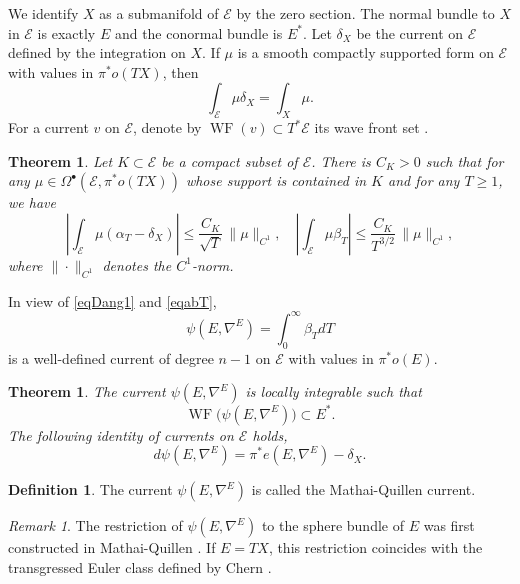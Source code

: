 \documentclass[JEP,XML,SOM,Unicode]{cedram}
\newcommand{\sbullet}{{\scriptscriptstyle\bullet}}
\let\mathcal\mathscr
\theoremstyle{plain}
\newtheorem{thm}[lem]{Theorem}
\theoremstyle{definition}
\newtheorem{defin}[lem]{Definition}
\theoremstyle{remark}
\newtheorem{re}[lem]{Remark}
\newcommand{\cE}{\mathcal{E}}
\DeclareMathOperator{\WF}{WF}
\let\l\leqslant
\let\g\geqslant
\begin{document}
We identify $X$ as a submanifold of $\cE$ by the zero section. The normal bundle
to $X$ in $\cE$ is exactly $E$ and the conormal bundle is $E^{*}$.
Let $\delta_{X}$ be the current on $\cE$ defined by the integration
on $X$. If $\mu$ is a smooth compactly supported form on $\cE$ with
values in $\pi^{*}o(TX)$, then
\begin{equation*}
\int_{\cE}\mu\delta_{X}=\int_{X}\mu.
\end{equation*}
For a current $v$ on $\cE$, denote by $\WF(v)\subset
T^{*}\cE$ its wave front set \cite[\S 8.1]{HormanderBook1}.

\begin{thm}
Let $K\subset
\cE$ be a compact subset of $\cE$. There is $C_{K}>0$ such that for
any $\mu\in
\Omega^{\sbullet}(\cE,\pi^{*}o(TX))$ whose support is contained in $K$
and for any $T\g 1$, we have
\begin{equation}\label{eqabT}
\left| \int_{\cE}\mu(\alpha_{T}-\delta_{X})\right|\l
\frac{C_{K}}{\sqrt{T}}\,\|\mu\|_{C^{1}},\quad\left|\int_{\cE}\mu \beta_{T}\right|\l
\frac{C_{K}}{T^{3/2}}\,\|\mu\|_{C^{1}},
\end{equation}
where $\|{\cdot}\|_{C^1}$ denotes the $C^{1}$-norm.
\end{thm}

In view of \eqref{eqDang1} and \eqref{eqabT},
\begin{equation*}
\psi(E,\nabla^{E})=\int_{0}^{\infty}\beta_{T}dT
\end{equation*}
is a well-defined current of degree $n-1$ on $\cE$ with values in $\pi^{*}o(E)$.

\begin{thm}
The current $\psi(E,\nabla^{E})$ is locally
integrable such that
\begin{equation*}\label{WFphi}
\WF \big(\psi(E,\nabla^{E})\big)\subset E^{*}.
\end{equation*}
The following identity of currents
on $\cE$ holds,
\begin{equation*}
d\psi(E,\nabla^{E})=\pi^{*}e(E,\nabla^{E})-\delta_{X}.
\end{equation*}
\end{thm}

\begin{defin}
The current $\psi(E,\nabla^{E})$ is called the Mathai-Quillen
current.
\end{defin}

\begin{re}
The restriction of $\psi(E,\nabla^{E})$ to the
sphere bundle of $E$
was first constructed in Mathai-Quillen \cite[\S 7]{MathaiQuillen}.
If $E=TX$, this restriction coincides with the transgressed Euler
class defined by Chern \cite{Chern2}.
\end{re}
\end{document}
